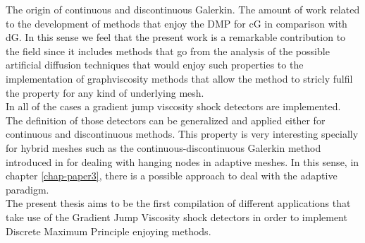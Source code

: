 The origin of continuous and discontinuous Galerkin. The amount of work related to the development of methods that enjoy the DMP for cG in comparison with dG. In this sense we feel that the present work is a remarkable contribution to the field since it includes methods that go from the analysis of the possible artificial diffusion techniques that would enjoy such properties to the implementation of graphviscosity methods that allow the method to stricly fulfil the property for any kind of underlying mesh.\\

In all of the cases a gradient jump viscosity shock detectors are implemented. The definition of those detectors can be generalized and applied either for continuous and discontinuous methods. This property is very interesting specially for hybrid meshes such as the continuous-discontinuous Galerkin method introduced in \cite{badia_adaptive_2013} for dealing with hanging nodes in adaptive meshes. In this sense, in chapter \ref{chap-paper3}, there is a possible approach to deal with the adaptive paradigm.\\

The present thesis aims to be the first compilation of different applications that take use of the Gradient Jump Viscosity shock detectors in order to implement Discrete Maximum Principle enjoying methods.\\